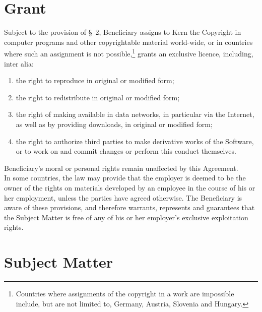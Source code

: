 \section{Grant}
\A Subject to the provision of {\S}~2, Beneficiary assigns to Kern the
Copyright in computer programs and other copyrightable material
world-wide, or in countries where such an assignment is not
possible,\footnote{Countries where assignments of the copyright in a
work are impossible include, but are not limited to, Germany, Austria,
Slovenia and Hungary.} grants an exclusive licence, including, inter
alia:
\begin{enumerate}
\item the right to reproduce in original or modified form;
\item the right to redistribute in original or modified form;
\item the right of making available in data networks, in particular
  via the Internet, as well as by providing downloads, in original or
  modified form;
\item the right to authorize third parties to make derivative works of
  the Software, or to work on and commit changes or perform this
  conduct themselves.
\end{enumerate}
\A Beneficiary's moral or personal rights remain unaffected by this
Agreement.\\ 
\A In some countries, the law may provide that the employer is deemed
to be the owner of the rights on materials developed by an employee in
the course of his or her employment, unless the parties have agreed
otherwise. The Beneficiary is aware of these provisions, and therefore
warrants, represents and guarantees that the Subject Matter is free of
any of his or her employer's exclusive exploitation rights.

\section{Subject Matter}

